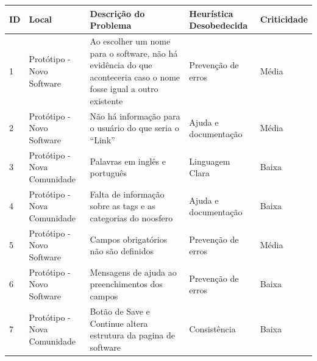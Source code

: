 \newpage

\begin{table}[h!]
\begin{tabular}{|l|p{3cm}|p{6cm}|p{3cm}|l|}
\hline
\textbf{ID} & \textbf{Local} & \textbf{Descrição do Problema}                                                                                     & \textbf{Heurística Desobedecida} & \textbf{Criticidade} \\ \hline
1           & Protótipo - Novo Software                 & Ao escolher um nome para o software, não há evidência do que aconteceria caso o nome fosse igual a outro existente & Prevenção de erros               & Média                \\ \hline
2           & Protótipo - Novo Software                 & Não há informação para o usuário do que seria o ``Link''                                                             & Ajuda e documentação             & Média                \\ \hline
3           & Protótipo - Nova Comunidade               & Palavras em inglês e português                                                                                     & Linguagem Clara                   & Baixa                \\ \hline
4           & Protótipo - Nova Comunidade               & Falta de informação sobre as tags e as categorias do noosfero                                                      & Ajuda e documentação             & Baixa                \\ \hline
5           & Protótipo - Novo Software                 & Campos obrigatórios não são definidos                                                                              & Prevenção de erros               & Média                \\ \hline
6           & Protótipo - Novo Software    & Mensagens de ajuda ao preenchimentos dos campos                                                                    & Prevenção de erros               & Baixa                \\ \hline
7           & Protótipo - Nova Comunidade               & Botão de Save e Continue altera estrutura da pagina de software                                                    & Consistência                     & Baixa                \\ \hline
\end{tabular}
\end{table}

\newpage

